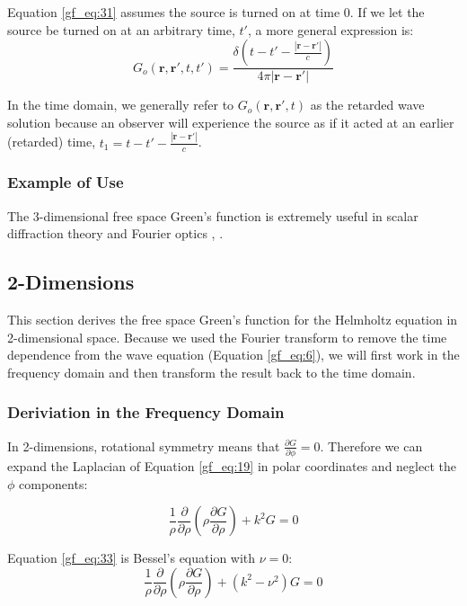 Equation \ref{gf_eq:31} assumes the source is turned on at time $0$. If we let the source be turned on at an arbitrary time, $t'$, a more general expression is:
\begin{equation}
G_o\left(\mathbf{r},\mathbf{r}',t,t'\right) = \frac{\delta\left(t-t'-\frac{|\mathbf{r}-\mathbf{r}'|}{c} \right)}{4\pi |\mathbf{r}-\mathbf{r}'|}
\label{gf_eq:32}
\end{equation}
\renewcommand{\baselinestretch}{2} \small\normalsize

In the time domain, we generally refer to $G_o\left(\mathbf{r},\mathbf{r}',t\right)$ as the retarded wave solution because an observer will experience the source as if it acted at an earlier (retarded) time, $t_1=t-t'-\frac{|\mathbf{r}-\mathbf{r}'|}{c}$.

\subsubsection{Example of Use}
The 3-dimensional free space Green's function is extremely useful in scalar diffraction theory and Fourier optics \cite{goodman_fourier}, \cite{born_wolf_po}.

\subsection{2-Dimensions}\label{gf_sec:2d}
This section derives the free space Green's function for the Helmholtz equation in 2-dimensional space. Because we used the Fourier transform to remove the time dependence from the wave equation (Equation \ref{gf_eq:6}), we will first work in the frequency domain and then transform the result back to the time domain.

\subsubsection{Deriviation in the Frequency Domain}
In 2-dimensions,  rotational symmetry means that  $\frac{\partial G}{\partial\phi} =0$. Therefore we can expand the Laplacian of Equation \ref{gf_eq:19} in polar coordinates and neglect the $\phi$ components:

\begin{equation}
\frac{1}{\rho}\frac{\partial}{\partial \rho}\left(\rho\frac{\partial G}{\partial \rho}\right)+ k^2G = 0
\label{gf_eq:33}
\end{equation}
\renewcommand{\baselinestretch}{2} \small\normalsize

\noindent Equation \ref{gf_eq:33} is Bessel's equation with $\nu = 0$:
\begin{equation}
\frac{1}{\rho}\frac{\partial}{\partial \rho}\left(\rho\frac{\partial G}{\partial \rho}\right)+ \left(k^2 -\nu^2\right)G = 0
\label{gf_eq:34}
\end{equation}
\renewcommand{\baselinestretch}{2} \small\normalsize

